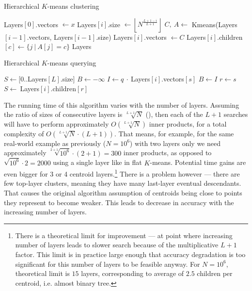 
\begin{algorithm}[H]
	\caption{Hierarchical $K$-means clustering}
	\begin{algorithmic}
		\State Layers$[0]$.vectors $\gets x $
			\State Layers$[i]$.size $\gets \left \lfloor N^{\frac{L + 1 - i}{L + 1}} \right \rfloor $
			\State $ C,\ A \gets$ Kmeans(Layers$[i - 1]$.vectors, Layers$[i - 1]$.size)
			\State Layers$[i]$.vectors $\gets C$
				\State Layers$[i]$.children$[c] \gets \{ j\ |\ A[j] = c \} $
			\EndFor
		\EndFor
		\State \Return Layers
	\end{algorithmic}
\label{alg:h-k-means}
\end{algorithm}

\begin{algorithm}[H]
	\caption{Hierarchical $K$-means querying}
	\begin{algorithmic}
		\State $ S \gets [0..$Layers$[L].$size$]$
		\For{$ i = L,\dots,0 $}
			\State $ B \gets -\infty $
			\For{$ s \in S $}
				\State $ I \gets q\ \cdot\ $Layers$[i]$.vectors$[s]$
				\If{$ I > B $}
					\State $ B \gets I $
					\State $ r \gets s $
				\EndIf
			\EndFor
			\If{$ i = 0 $}
				\State \Return {$ r $}
			\EndIf
			\State $ S \gets\ $Layers$[i].$children$[r]$
		\EndFor
	\end{algorithmic}
\end{algorithm}

The running time of this algorithm varies with the number of layers. Assuming 
the ratio of sizes of consecutive layers is $ \sqrt[L+1]{N} $ (),
then each of the $ L + 1 $ searches will have to perform approximately
$ O(\sqrt[L+1]{N}) $ inner products, for a total complexity of
$ O(\sqrt[L+1]{N} \cdot (L + 1)) $. That means, for example, for the same real-world
example as previously ($ N=10^6 $) with two layers only we need approximately
$ \sqrt[2+1]{10^6} \cdot (2 + 1) = 300 $ inner products, as opposed
to $ \sqrt{10^6} \cdot 2 = 2000 $ using a single layer like in flat $K$-means.
Potential time gains are even bigger for 3 or 4 centroid layers.\footnote{
There is a theoretical limit for improvement --- at point where increasing
number of layers leads to slower search because of the multiplicative $L+1$ factor.
This limit is in practice large enough that accuracy degradation is too 
significant for this number of layers to be feasible anyway. 
For $N=10^6$, theoretical limit is $15$ layers, corresponding to average 
of $2.5$ children per centroid, i.e. almost binary tree.
} There is a problem however --- there are few top-layer clusters,
meaning they have many last-layer eventual descendants. That causes the
original algorithm assumption of centroids being close to points they represent
to become weaker. This leads to decrease in accuracy with the increasing number of layers.


